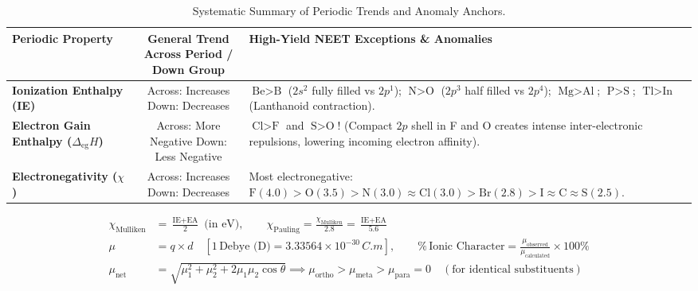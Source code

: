 \documentclass[11pt,a4paper]{article}
\begin{document}
\begin{table}[htbp]
\centering
\small
\renewcommand{\arraystretch}{1.2}
\begin{tabularx}{\textwidth}{L c L}
\toprule
\textbf{Periodic Property} & \textbf{General Trend Across Period / Down Group} & \textbf{High-Yield NEET Exceptions \& Anomalies} \\
\midrule
\textbf{Ionization Enthalpy (IE)} & Across: Increases \quad Down: Decreases & $\text{Be} > \text{B}$ ($2s^2$ fully filled vs $2p^1$); $\text{N} > \text{O}$ ($2p^3$ half filled vs $2p^4$); $\text{Mg} > \text{Al}$; $\text{P} > \text{S}$; $\text{Tl} > \text{In}$ (Lanthanoid contraction). \\
\textbf{Electron Gain Enthalpy ($\Delta_{\text{eg}}H$)} & Across: More Negative \quad Down: Less Negative & $\text{Cl} > \text{F}$ and $\text{S} > \text{O}$! (Compact $2p$ shell in F and O creates intense inter-electronic repulsions, lowering incoming electron affinity). \\
\textbf{Electronegativity ($\chi$)} & Across: Increases \quad Down: Decreases & Most electronegative: $\text{F} (4.0) > \text{O} (3.5) > \text{N} (3.0) \approx \text{Cl} (3.0) > \text{Br} (2.8) > \text{I} \approx \text{C} \approx \text{S} (2.5)$. \\
\bottomrule
\end{tabularx}
\caption{Systematic Summary of Periodic Trends and Anomaly Anchors.}
\end{table}

\begin{formulabox}
\begin{align}
  \chi_{\text{Mulliken}} &= \frac{\text{IE} + \text{EA}}{2}\text{ (in eV)}, \qquad \chi_{\text{Pauling}} = \frac{\chi_{\text{Mulliken}}}{2.8} = \frac{\text{IE} + \text{EA}}{5.6} \\
  \mu &= q \times d \quad [1\,\text{Debye (D)} = 3.33564\times 10^{-30}\,\si{C.m}], \qquad \%\,\text{Ionic Character} = \frac{\mu_{\text{observed}}}{\mu_{\text{calculated}}} \times 100\% \\
  \mu_{\text{net}} &= \sqrt{\mu_1^2 + \mu_2^2 + 2\mu_1\mu_2\cos\theta} \implies \mu_{\text{ortho}} > \mu_{\text{meta}} > \mu_{\text{para}} = 0 \quad (\text{for identical substituents})
\end{align}
\end{formulabox}
\end{document}
